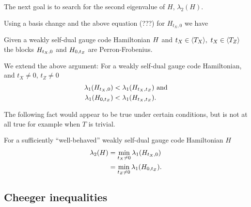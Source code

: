 \documentclass[12pt]{article}
\renewenvironment{framed}[1][\hsize]{%
\def\FrameCommand{{\color{black}\vrule width 3pt}\hspace{0pt}\fboxsep=\FrameSep\colorbox{lightgray}}%
\MakeFramed{\hsize0.8\linewidth\advance\hsize-\width\FrameRestore}}
{\endMakeFramed}
\begin{document}


The next goal is to search for
the second eigenvalue of $H$,
$\lambda_2(H).$

Using a basis change and the
above equation (???) for $H_{t_X,0}$
we have
\begin{framed}

Given a weakly self-dual
gauge code Hamiltonian $H$ and
$t_X\in \langle T_X \rangle,\  t_X\in \langle T_Z \rangle$
the blocks $H_{t_X,0}$ and 
$H_{0,t_Z}$ are Perron-Frobenius.
\end{framed}

We extend the above argument:
\begin{framed}
For a weakly self-dual gauge code
Hamiltonian,
and $t_X\ne 0$, $t_Z\ne 0$
\begin{align*}
\lambda_1(H_{t_X,0}) &< 
    \lambda_1(H_{t_X,t_Z}) \ \mbox{and}\\
\lambda_1(H_{0,t_Z}) &< 
    \lambda_1(H_{t_X,t_Z}).
\end{align*}
\end{framed}

The following fact would appear to
be true under certain conditions,
but is not at all true
for example when $T$ is trivial.
\begin{framed}

For a sufficiently ``well-behaved''
weakly self-dual
gauge code Hamiltonian $H$
\begin{align*}
\lambda_2(H) 
    &= \min_{t_X\ne 0} \lambda_1(H_{t_X,0})\\
    &= \min_{t_Z\ne 0} \lambda_1(H_{0,t_Z}).
\end{align*}
\end{framed}

\subsection{Cheeger inequalities}
\end{document}
